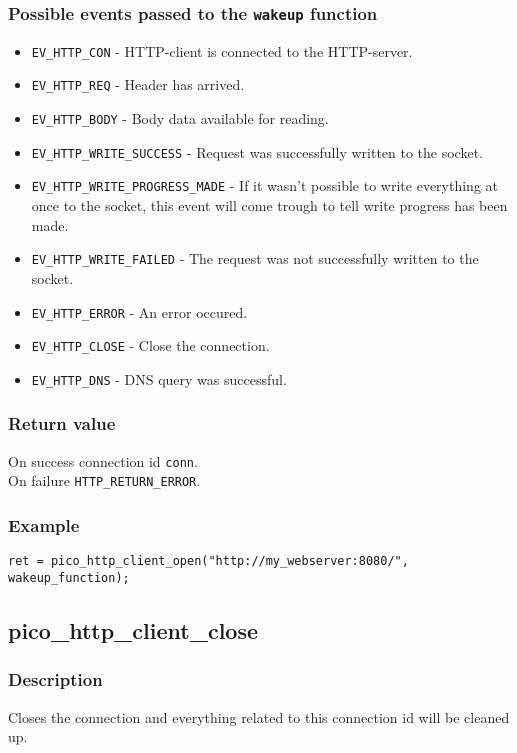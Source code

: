 \subsubsection*{Possible events passed to the \texttt{wakeup} function}
\begin{itemize}[noitemsep]
\item \texttt{EV\_HTTP\_CON} - HTTP-client is connected to the HTTP-server.
\item \texttt{EV\_HTTP\_REQ} - Header has arrived.
\item \texttt{EV\_HTTP\_BODY} - Body data available for reading.
\item \texttt{EV\_HTTP\_WRITE\_SUCCESS} - Request was successfully written to the socket.
\item \texttt{EV\_HTTP\_WRITE\_PROGRESS\_MADE} - If it wasn't possible to write everything at once to the socket, this event will come trough to tell write progress has been made.
\item \texttt{EV\_HTTP\_WRITE\_FAILED} - The request was not successfully written to the socket.
\item \texttt{EV\_HTTP\_ERROR} - An error occured.
\item \texttt{EV\_HTTP\_CLOSE} - Close the connection.
\item \texttt{EV\_HTTP\_DNS} - DNS query was successful.
\end{itemize}
\subsubsection*{Return value}
On success connection id \texttt{conn}.
\\On failure \texttt{HTTP\_RETURN\_ERROR}.

\subsubsection*{Example}
\begin{verbatim}
ret = pico_http_client_open("http://my_webserver:8080/", wakeup_function);
\end{verbatim}


\subsection{pico\_http\_client\_close}

\subsubsection*{Description}
Closes the connection and everything related to this connection id will be cleaned up.

